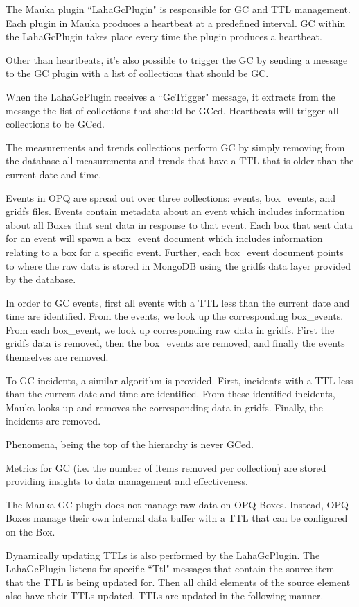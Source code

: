 The Mauka plugin ``LahaGcPlugin" is responsible for GC and TTL management. Each plugin in Mauka produces a heartbeat at a predefined interval. GC within the LahaGcPlugin takes place every time the plugin produces a heartbeat.

Other than heartbeats, it's also possible to trigger the GC by sending a message to the GC plugin with a list of collections that should be GC.

When the LahaGcPlugin receives a ``GcTrigger" message, it extracts from the message the list of collections that should be GCed. Heartbeats will trigger all collections to be GCed.

The measurements and trends collections perform GC by simply removing from the database all measurements and trends that have a TTL that is older than the current date and time.

Events in OPQ are spread out over three collections: events, box\_events, and gridfs files. Events contain metadata about an event which includes information about all Boxes that sent data in response to that event. Each box that sent data for an event will spawn a box\_event document which includes information relating to a box for a specific event. Further, each box\_event document points to where the raw data is stored in MongoDB using the gridfs data layer provided by the database.

In order to GC events, first all events with a TTL less than the current date and time are identified. From the events, we look up the corresponding box\_events. From each box\_event, we look up corresponding raw data in gridfs. First the gridfs data is removed, then the box\_events are removed, and finally the events themselves are removed. 

To GC incidents, a similar algorithm is provided. First, incidents with a TTL less than the current date and time are identified. From these identified incidents, Mauka looks up and removes the corresponding data in gridfs. Finally, the incidents are removed.

Phenomena, being the top of the hierarchy is never GCed.

Metrics for GC (i.e. the number of items removed per collection) are stored providing insights to data management and effectiveness. 

The Mauka GC plugin does not manage raw data on OPQ Boxes. Instead, OPQ Boxes manage their own internal data buffer with a TTL that can be configured on the Box.

Dynamically updating TTLs is also performed by the LahaGcPlugin. The LahaGcPlugin listens for specific ``Ttl" messages that contain the source item that the TTL is being updated for. Then all child elements of the source element also have their TTLs updated. TTLs are updated in the following manner.

